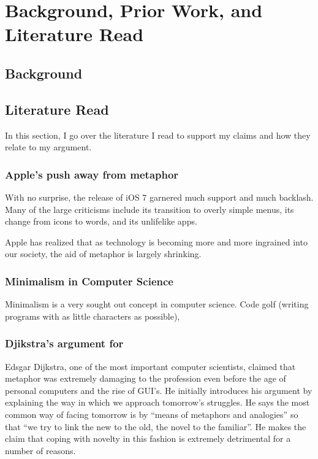 \documentclass[11pt, oneside]{article}   	%
\begin{document}
\cite{bae16}

\section{Background, Prior Work, and Literature Read}

\subsection{Background}

\subsection{Literature Read}

In this section, I go over the literature I read to support my claims and how they relate to my argument.

\subsubsection{Apple's push away from metaphor}

With no surprise, the release of iOS 7 garnered much support and much backlash. Many of the large criticisms include its transition to overly simple menus, its change from icons to words, and its unlifelike apps. 

Apple has realized that as technology is becoming more and more ingrained into our society, the aid of metaphor is largely shrinking.

\subsubsection{Minimalism in Computer Science}
Minimalism is a very sought out concept in computer science. Code golf (writing programs with as little characters as possible), 

\subsubsection{Djikstra's argument for}
Edsgar Dijkstra, one of the most important computer scientists, claimed that metaphor was extremely damaging to the profession even before the age of personal computers and the rise of GUI's. He initially introduces his argument by explaining the way in which we approach tomorrow's struggles. He says the most common way of facing tomorrow is by ``means of metaphors and analogies'' so that ``we try to link the new to the old, the novel to the familiar''. He makes the claim that coping with novelty in this fashion is extremely detrimental for a number of reasons.
\end{document}
